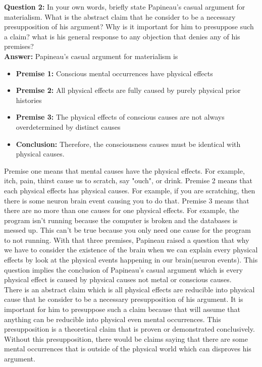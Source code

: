 \documentclass{article}
\begin{document}
\indent \textbf{Question 2:} In your own words, briefly state Papineau's casual argument for materialism. What is the abstract claim that he consider to be a necessary presupposition of his argument? Why is it important for him to presuppose such a claim? what is his general response to any objection that denies any of his premises?\\
\indent \textbf{Answer: } Papineau's casual argument for materialism is
\begin{itemize}
\item \textbf{Premise 1:} Conscious mental occurrences have physical effects
\item \textbf{Premise 2:} All physical effects are fully caused by purely physical prior histories
\item \textbf{Premise 3:} The physical effects of conscious causes are not always overdetermined by distinct causes
\item \textbf{Conclusion:} Therefore, the consciousness causes must be identical with physical causes.
\end{itemize}

\indent Premise one means that mental causes have the physical effects. For example, itch, pain, thirst cause us to scratch, say "ouch", or drink. Premise 2 means that each physical effects has physical causes. For example, if you are scratching, then there is some neuron brain event causing you to do that. Premise 3 means that there are no more than one causes for one physical effects. For example, the program isn't running because the computer is broken and the databases is messed up. This can't be true because you only need one cause for the program to not running. With that three premises, Papineau raised a question that why we have to consider the existence of the brain when we can explain every physical effects by look at the physical events happening in our brain(neuron events). This question implies the conclusion of Papineau's casual argument which is every physical effect is caused by physical causes not metal or conscious causes.\\

\indent There is an abstract claim which is all physical effects are reducible into physical cause that he consider to be a necessary presupposition of his argument. It is important for him to presuppose such a claim because that will assume that anything can be reducible into physical even mental occurrences. This presupposition is a theoretical claim that is proven or demonstrated conclusively. Without this presupposition, there would be claims saying that there are some mental occurrences that is outside of the physical world which can disproves his argument.\\ 
\end{document}
